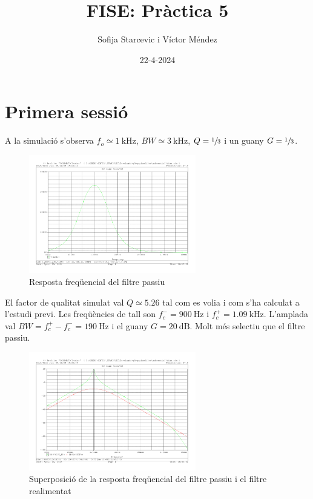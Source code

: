 \documentclass[catalan, a4paper, nobib]{tufte-handout}
\author{Sofija Starcevic i Víctor Méndez}
\title{FISE: Pràctica 5}
\date{22-4-2024}
\begin{document}
\maketitle

\part{Primera sessió}
 A la simulació s'observa $f_o\simeq\qty{1}{\kilo\hertz}$, $BW\simeq\qty{3}{\kilo\hertz}$, $Q=\sfrac{1}{3}$ i un guany $G=\sfrac{1}{3}$.

\begin{figure}[!h]
    \begin{center}
        \includegraphics[width=275px]{1.pdf}
    \end{center}
    \caption{Resposta freqüencial del filtre passiu}
\end{figure}

 El factor de qualitat simulat val $Q\simeq\num{5.26}$ tal com es volia i com s'ha calculat a l'estudi previ. Les freqüències de tall son $f_c^-=\qty{900}{\hertz}$ i $f_c^+=\qty{1.09}{\kilo\hertz}$. L'amplada val $BW=f_c^+-f_c^-=\qty{190}{\hertz}$ i el guany $G=\qty{20}{\deci\bel}$. Molt més selectiu que el filtre passiu.

\begin{figure}
    \begin{center}
        \includegraphics[width=275px]{2.pdf}
    \end{center}
    \caption{Superposició de la resposta freqüencial del filtre passiu i el filtre realimentat}
\end{figure}
\end{document}
